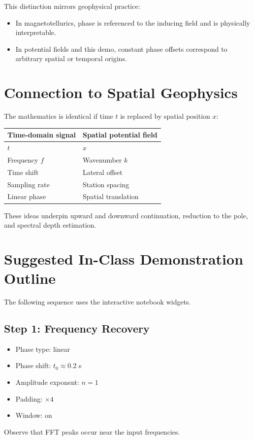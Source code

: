 \documentclass[11pt,a4paper]{article}
\begin{document}
This distinction mirrors geophysical practice:
\begin{itemize}
  \item In magnetotellurics, phase is referenced to the inducing field and is physically interpretable.
  \item In potential fields and this demo, constant phase offsets correspond to arbitrary spatial or temporal origins.
\end{itemize}

\section{Connection to Spatial Geophysics}

The mathematics is identical if time $t$ is replaced by spatial position $x$:
\begin{table}
    \centering
    \begin{tabular}{ll}
        \toprule
        \textbf{Time-domain signal} &
        \textbf{Spatial potential field} \\
        \midrule
        $t$ & $x$ \\
        Frequency $f$ & Wavenumber $k$ \\
        Time shift & Lateral offset \\
        Sampling rate & Station spacing \\
        Linear phase & Spatial translation \\
        \bottomrule
    \end{tabular}
\end{table}

These ideas underpin upward and downward continuation, reduction to the pole, and spectral depth estimation.

\section{Suggested In-Class Demonstration Outline}

The following sequence uses the interactive notebook widgets.

\subsection*{Step 1: Frequency Recovery}
\begin{itemize}
  \item Phase type: linear
  \item Phase shift: $t_0 \approx 0.2$ s
  \item Amplitude exponent: $n = 1$
  \item Padding: $\times 4$
  \item Window: on
\end{itemize}
Observe that FFT peaks occur near the input frequencies.
\end{document}
